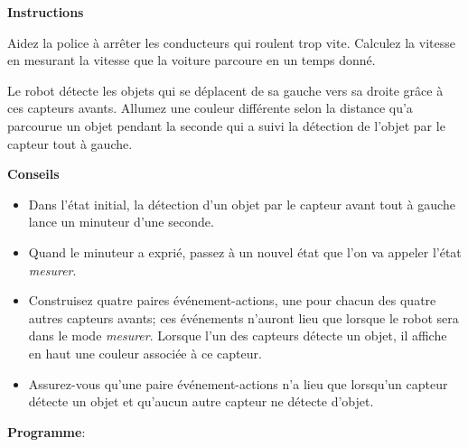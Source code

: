 \label{ch.radar}

\textbf{Instructions}

Aidez la police à arrêter les conducteurs qui roulent trop vite.
Calculez la vitesse en mesurant la vitesse que la voiture parcoure en un temps donné.

Le robot détecte les objets qui se déplacent de sa gauche vers sa droite grâce à ces capteurs
avants.
Allumez une couleur différente selon la distance qu'a parcourue un objet pendant la seconde
qui a suivi la détection de l'objet par le capteur tout à gauche.

\textbf{Conseils}

\begin{itemize}

\item Dans l'état initial, la détection d'un objet par le capteur avant tout à gauche lance un
    minuteur d'une seconde.

\item Quand le minuteur a exprié, passez à un nouvel état que l'on va appeler l'état \emph{mesurer}.

\item Construisez quatre paires événement-actions, une pour chacun des quatre autres capteurs avants;
    ces événements n'auront lieu que lorsque le robot sera dans le mode \emph{mesurer}.
    Lorsque l'un des capteurs détecte un objet, il affiche en haut une couleur associée à ce capteur.

\item Assurez-vous qu'une paire événement-actions n'a lieu que lorsqu'un capteur détecte un objet
    et qu'aucun autre capteur ne détecte d'objet.

\end{itemize}

\bigskip

{\raggedleft \hfill \textbf{Programme}: }
